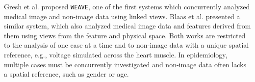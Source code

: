 \documentclass[journal]{style/vgtc} 			          %
\newcommand{\com}[1]{\textcolor{orange}{\uline{#1}}}
\begin{document}
Gresh et al. \cite{Gresh2000} proposed \texttt{WEAVE}, one of the first systems which concurrently analyzed medical image and non-image data using linked views.
%
Blaas et al. \cite{Blaas2007} presented a similar system, which also analyzed medical image data and features derived from them using views from the feature and physical space.
%
Both works are restricted to the analysis of one case at a time and to non-image data with a unique spatial reference, e.g., voltage simulated across the heart muscle.
%
In epidemiology, multiple cases must be concurrently investigated and non-image data often lacks a spatial reference, such as gender or age.
%
\end{document}
